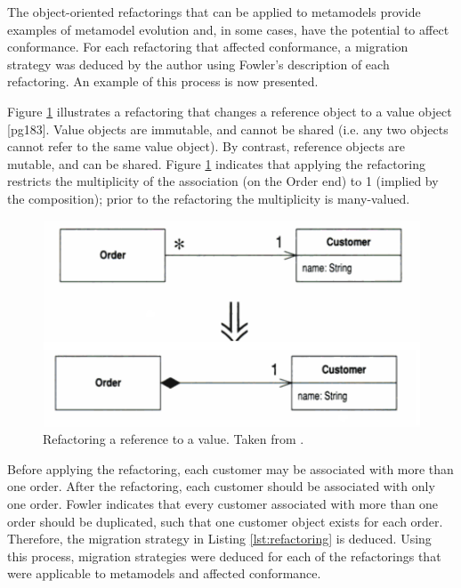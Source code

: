 The object-oriented refactorings that can be applied to metamodels provide examples of metamodel evolution and, in some cases, have the potential to affect conformance. For each refactoring that affected conformance, a migration strategy was deduced by the author using Fowler's description of each refactoring. An example of this process is now presented.

Figure \ref{fig:refactoring} illustrates a refactoring that changes a reference object to a value object \cite{fowler99refactoring}[pg183]. Value objects are immutable, and cannot be shared (i.e. any two objects cannot refer to the same value object). By contrast, reference objects are mutable, and can be shared. Figure \ref{fig:refactoring} indicates that applying the refactoring restricts the multiplicity of the association (on the Order end) to 1 (implied by the composition); prior to the refactoring the multiplicity is many-valued.

\begin{figure}[htbp]
  \begin{center}
    \leavevmode
    \includegraphics[scale=0.5]{4.Analysis/exemplar_refactoring.pdf}
  \end{center}
  \caption[Refactoring a reference to a value]{Refactoring a reference to a value. Taken from \cite[pg183]{fowler99refactoring}.}
  \label{fig:refactoring}
\end{figure}

Before applying the refactoring, each customer may be associated with more than one order. After the refactoring, each customer should be associated with only one order. Fowler indicates that every customer associated with more than one order should be duplicated, such that one customer object exists for each order. Therefore, the migration strategy in Listing \ref{lst:refactoring} is deduced. Using this process, migration strategies were deduced for each of the refactorings that were applicable to metamodels and affected conformance.

